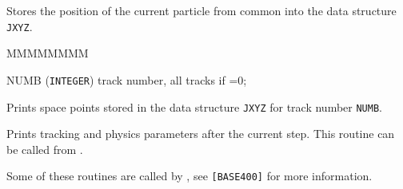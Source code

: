         
        

Stores the position of the current particle from common  into
the data structure {\tt JXYZ}.
 
 
\begin{DLtt}{MMMMMMMM}
\item[NUMB] ({\tt INTEGER}) track number, all tracks if =0;
\end{DLtt}
Prints space points stored in the data structure {\tt JXYZ}
for track number {\tt NUMB}.
 
Prints tracking and physics parameters after
the current step. This routine can be called from .
 
Some of these routines are called by , see {\tt [BASE400]}
for more information.

